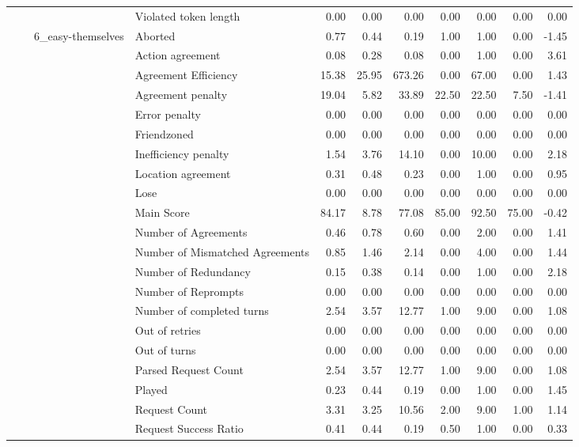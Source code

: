 \begin{tabular}{llllrrrrrrr}
 &  &  & Violated token length & 0.00 & 0.00 & 0.00 & 0.00 & 0.00 & 0.00 & 0.00 \\
\cline{3-11}
 &  & \multirow[t]{27}{*}{6_easy-themselves} & Aborted & 0.77 & 0.44 & 0.19 & 1.00 & 1.00 & 0.00 & -1.45 \\
 &  &  & Action agreement & 0.08 & 0.28 & 0.08 & 0.00 & 1.00 & 0.00 & 3.61 \\
 &  &  & Agreement Efficiency & 15.38 & 25.95 & 673.26 & 0.00 & 67.00 & 0.00 & 1.43 \\
 &  &  & Agreement penalty & 19.04 & 5.82 & 33.89 & 22.50 & 22.50 & 7.50 & -1.41 \\
 &  &  & Error penalty & 0.00 & 0.00 & 0.00 & 0.00 & 0.00 & 0.00 & 0.00 \\
 &  &  & Friendzoned & 0.00 & 0.00 & 0.00 & 0.00 & 0.00 & 0.00 & 0.00 \\
 &  &  & Inefficiency penalty & 1.54 & 3.76 & 14.10 & 0.00 & 10.00 & 0.00 & 2.18 \\
 &  &  & Location agreement & 0.31 & 0.48 & 0.23 & 0.00 & 1.00 & 0.00 & 0.95 \\
 &  &  & Lose & 0.00 & 0.00 & 0.00 & 0.00 & 0.00 & 0.00 & 0.00 \\
 &  &  & Main Score & 84.17 & 8.78 & 77.08 & 85.00 & 92.50 & 75.00 & -0.42 \\
 &  &  & Number of Agreements & 0.46 & 0.78 & 0.60 & 0.00 & 2.00 & 0.00 & 1.41 \\
 &  &  & Number of Mismatched Agreements & 0.85 & 1.46 & 2.14 & 0.00 & 4.00 & 0.00 & 1.44 \\
 &  &  & Number of Redundancy & 0.15 & 0.38 & 0.14 & 0.00 & 1.00 & 0.00 & 2.18 \\
 &  &  & Number of Reprompts & 0.00 & 0.00 & 0.00 & 0.00 & 0.00 & 0.00 & 0.00 \\
 &  &  & Number of completed turns & 2.54 & 3.57 & 12.77 & 1.00 & 9.00 & 0.00 & 1.08 \\
 &  &  & Out of retries & 0.00 & 0.00 & 0.00 & 0.00 & 0.00 & 0.00 & 0.00 \\
 &  &  & Out of turns & 0.00 & 0.00 & 0.00 & 0.00 & 0.00 & 0.00 & 0.00 \\
 &  &  & Parsed Request Count & 2.54 & 3.57 & 12.77 & 1.00 & 9.00 & 0.00 & 1.08 \\
 &  &  & Played & 0.23 & 0.44 & 0.19 & 0.00 & 1.00 & 0.00 & 1.45 \\
 &  &  & Request Count & 3.31 & 3.25 & 10.56 & 2.00 & 9.00 & 1.00 & 1.14 \\
 &  &  & Request Success Ratio & 0.41 & 0.44 & 0.19 & 0.50 & 1.00 & 0.00 & 0.33 \\

\end{tabular}
